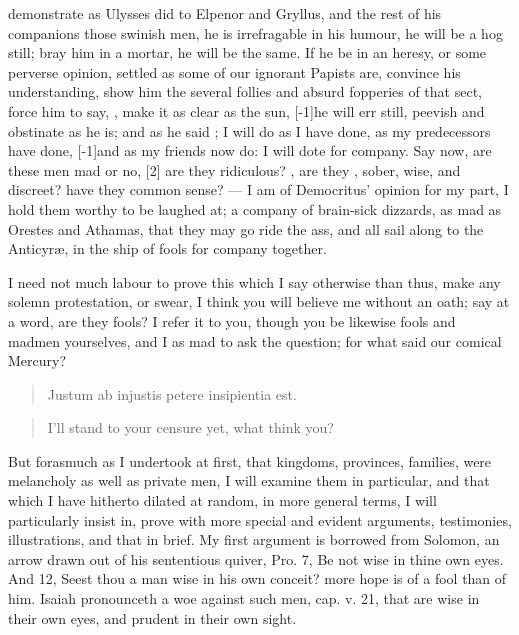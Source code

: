 demonstrate as Ulysses did to Elpenor and Gryllus, and the rest of
his companions those swinish men, he is irrefragable in his humour, he
will be a hog still; bray him in a mortar, he will be the same. If he
be in an heresy, or some perverse opinion, settled as some of our
ignorant Papists are, convince his understanding, show him the several
follies and absurd fopperies of that sect, force him to say, , make it as clear as the sun, [-1\baselineskip]he will err still, peevish
and obstinate as he is; and as he said ; I will do as I have done, as
my predecessors have done, [-1\baselineskip]and as my friends now do: I will dote
for company. Say now, are these men mad or no, [2\baselineskip] are they ridiculous? , are they , sober, wise, and discreet? have they common sense? --- I am of Democritus' opinion for my part, I hold
them worthy to be laughed at; a company of brain-sick dizzards, as mad
as Orestes and Athamas, that they may go ride the ass, and all
sail along to the Anticyr\ae{}, in the ship of fools for company together.

I need not much labour to prove this which I say otherwise than thus,
make any solemn protestation, or swear, I think you will believe me
without an oath; say at a word, are they fools? I refer it to you,
though you be likewise fools and madmen yourselves, and I as mad to ask
the question; for what said our comical Mercury?

\begin{verse}
Justum ab injustis petere insipientia est.
\end{verse}
\translationrule%
\begin{verse}
I'll stand to your censure yet, what think you?
\end{verse}
%

But forasmuch as I undertook at first, that kingdoms, provinces,
families, were melancholy as well as private men, I will examine them
in particular, and that which I have hitherto dilated at random, in
more general terms, I will particularly insist in, prove with more
special and evident arguments, testimonies, illustrations, and that in
brief.  My first
argument is borrowed from Solomon, an arrow drawn out of his
sententious quiver, Pro.  7, Be not wise in thine own eyes. And
 12, Seest thou a man wise in his own conceit? more hope is of a
fool than of him. Isaiah pronounceth a woe against such men, cap. v.
21, that are wise in their own eyes, and prudent in their own sight.

